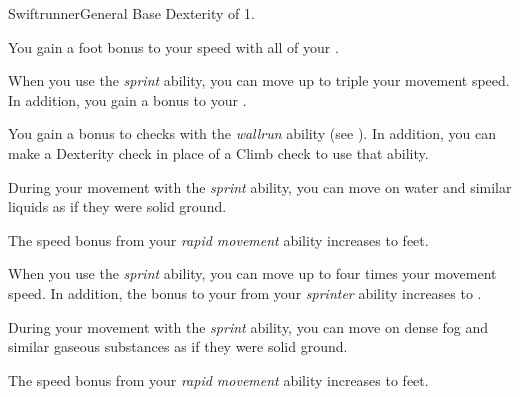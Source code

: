     \begin{feat}{Swiftrunner}{General}
        \featpre Base Dexterity of 1.

         You gain a  foot bonus to your speed with all of your .

         When you use the \textit{sprint} ability, you can move up to triple your movement speed.
        In addition, you gain a  bonus to your .

         You gain a  bonus to checks with the \textit{wallrun} ability (see ).
        In addition, you can make a Dexterity check in place of a Climb check to use that ability.

         During your movement with the \textit{sprint} ability, you can move on water and similar liquids as if they were solid ground.

         The speed bonus from your \textit{rapid movement} ability increases to  feet.

         When you use the \textit{sprint} ability, you can move up to four times your movement speed.
        In addition, the bonus to your  from your \textit{sprinter} ability increases to .

         During your movement with the \textit{sprint} ability, you can move on dense fog and similar gaseous substances as if they were solid ground.

         The speed bonus from your \textit{rapid movement} ability increases to  feet.
    \end{feat}

